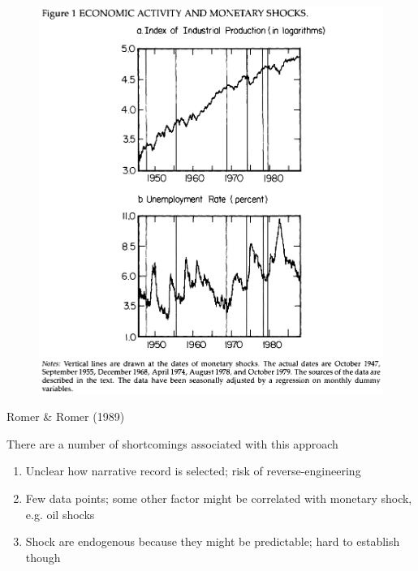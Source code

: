 \documentclass{beamer}
\begin{document}
\begin{frame}
  \begin{figure}
    \includegraphics[scale=.6]{romer_romer.eps}
  \end{figure}
  Romer \& Romer (1989)
\end{frame}

\begin{frame}
  There are a number of shortcomings associated with this approach  
  \begin{enumerate}
    \item Unclear how narrative record is selected; risk of reverse-engineering 
    \item Few data points; some other factor might be correlated with monetary shock, e.g. oil shocks
    \item Shock are endogenous because they might be predictable; hard to establish though
  \end{enumerate}
\end{frame}
\end{document}

